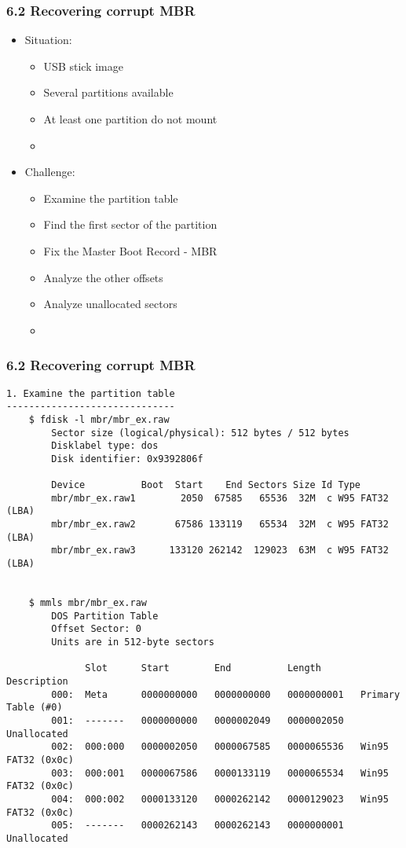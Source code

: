 \begin{frame}[fragile]
  \frametitle{6.2 Recovering corrupt MBR}
  \begin{itemize}
    \item Situation:
    \begin{itemize}
      \item USB stick image
      \item Several partitions available
      \item At least one partition do not mount
      \item[]
    \end{itemize}
    \item Challenge:
    \begin{itemize}
      \item Examine the partition table
      \item Find the first sector of the partition
      \item Fix the Master Boot Record - MBR
      \item Analyze the other offsets
      \item Analyze unallocated sectors
      \item[]
    \end{itemize}
  \end{itemize}
\end{frame}


\begin{frame}[fragile]
  \frametitle{6.2 Recovering corrupt MBR}
  \begin{lstlisting}[basicstyle=\tiny]
1. Examine the partition table
------------------------------
    $ fdisk -l mbr/mbr_ex.raw 
        Sector size (logical/physical): 512 bytes / 512 bytes
        Disklabel type: dos
        Disk identifier: 0x9392806f

        Device          Boot  Start    End Sectors Size Id Type
        mbr/mbr_ex.raw1        2050  67585   65536  32M  c W95 FAT32 (LBA)
        mbr/mbr_ex.raw2       67586 133119   65534  32M  c W95 FAT32 (LBA)
        mbr/mbr_ex.raw3      133120 262142  129023  63M  c W95 FAT32 (LBA)
  
  
    $ mmls mbr/mbr_ex.raw
        DOS Partition Table
        Offset Sector: 0
        Units are in 512-byte sectors

              Slot      Start        End          Length       Description
        000:  Meta      0000000000   0000000000   0000000001   Primary Table (#0)
        001:  -------   0000000000   0000002049   0000002050   Unallocated
        002:  000:000   0000002050   0000067585   0000065536   Win95 FAT32 (0x0c)
        003:  000:001   0000067586   0000133119   0000065534   Win95 FAT32 (0x0c)
        004:  000:002   0000133120   0000262142   0000129023   Win95 FAT32 (0x0c)
        005:  -------   0000262143   0000262143   0000000001   Unallocated
  \end{lstlisting}
\end{frame}


